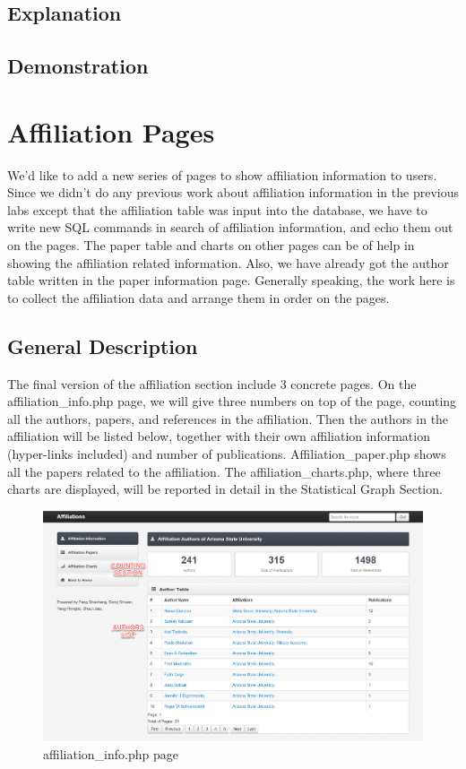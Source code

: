 \documentclass{book}
\begin{document}
\subsection{Explanation}

\subsection{Demonstration}

\section {Affiliation Pages}

We'd like to add a new series of pages to show affiliation information to users. Since we didn't do any previous work about affiliation information in the previous labs except that the affiliation table was input into the database, we have to write new SQL commands in search of affiliation information, and echo them out on the pages. The paper table and charts on other pages can be of help in showing the affiliation related information. Also, we have already got the author table written in the paper information page. Generally speaking, the work here is to collect the affiliation data and arrange them in order on the pages.


\subsection {General Description}

The final version of the affiliation section include 3 concrete pages. On the affiliation\_info.php page, we will give three numbers on top of the page, counting all the authors, papers, and references in the affiliation. Then the authors in the affiliation will be listed below, together with their own affiliation information (hyper-links included) and number of publications. Affiliation\_paper.php shows all the papers related to the affiliation. The affiliation\_charts.php, where three charts are displayed, will be reported in detail in the Statistical Graph Section.

\begin{figure}[H]
\centering
\includegraphics[scale=0.35]{img/zlt_aff_demo1.png}
\caption{affiliation\_info.php page}
\end{figure}
\end{document}

